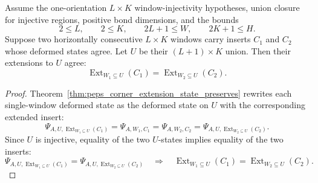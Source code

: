 \begin{theorem}
    \label{thm:peps_horizontal_consecutive_window_extend_eq}
    \leanok
    Assume the one-orientation $L\times K$ window-injectivity hypotheses,
    union closure for injective regions, positive bond dimensions, and the
    bounds
    \[
        2\le L,\qquad 2\le K,\qquad 2L+1\le W,\qquad 2K+1\le H.
    \]
    Suppose two horizontally consecutive $L\times K$ windows carry inserts
    $C_1$ and $C_2$ whose deformed states agree.  Let $U$ be their
    $(L+1)\times K$ union.  Then their extensions to $U$ agree:
    \[
        \operatorname{Ext}_{W_1\subseteq U}(C_1)
        =
        \operatorname{Ext}_{W_2\subseteq U}(C_2).
    \]
\end{theorem}
\begin{proof}
    \leanok
    Theorem~\ref{thm:peps_corner_extension_state_preserves} rewrites each
    single-window deformed state as the deformed state on $U$ with the
    corresponding extended insert:
    \[
        \Psi_{A,U,\operatorname{Ext}_{W_1\subseteq U}(C_1)}
        =
        \Psi_{A,W_1,C_1}
        =
        \Psi_{A,W_2,C_2}
        =
        \Psi_{A,U,\operatorname{Ext}_{W_2\subseteq U}(C_2)}.
    \]
    Since $U$ is injective, equality of the two $U$-states implies equality
    of the two inserts:
    \[
        \Psi_{A,U,\operatorname{Ext}_{W_1\subseteq U}(C_1)}
        =
        \Psi_{A,U,\operatorname{Ext}_{W_2\subseteq U}(C_2)}
        \quad\Longrightarrow\quad
        \operatorname{Ext}_{W_1\subseteq U}(C_1)
        =
        \operatorname{Ext}_{W_2\subseteq U}(C_2).
    \]
\end{proof}



